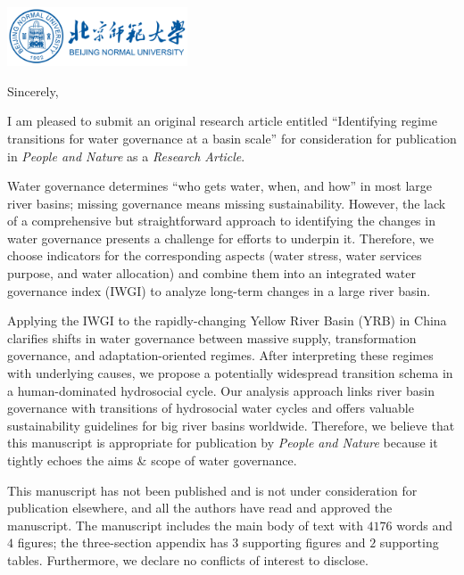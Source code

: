 \documentclass[11pt,a4paper,roman]{moderncv}
\begin{document}
\begin{minipage}[t]{\textwidth}
\includegraphics[width=0.40\textwidth]{bnu}
\end{minipage}


\opening{\vspace*{-2em}}
\closing{Sincerely,}{\vspace*{-2em}}
\makelettertitle

I am pleased to submit an original research article entitled ``Identifying regime transitions for water governance at a basin scale'' for consideration for publication in \textit{People and Nature} as a \textit{Research Article}.

Water governance determines ``who gets water, when, and how'' in most large river basins; missing governance means missing sustainability. However, the lack of a comprehensive but straightforward approach to identifying the changes in water governance presents a challenge for efforts to underpin it. Therefore, we choose indicators for the corresponding aspects (water stress, water services purpose, and water allocation) and combine them into an integrated water governance index (IWGI) to analyze long-term changes in a large river basin.

Applying the IWGI to the rapidly-changing Yellow River Basin (YRB) in China clarifies shifts in water governance between massive supply, transformation governance, and adaptation-oriented regimes. After interpreting these regimes with underlying causes, we propose a potentially widespread transition schema in a human-dominated hydrosocial cycle. Our analysis approach links river basin governance with transitions of hydrosocial water cycles and offers valuable sustainability guidelines for big river basins worldwide. Therefore, we believe that this manuscript is appropriate for publication by \textit{People and Nature} because it tightly echoes the aims \& scope of water governance.

This manuscript has not been published and is not under consideration for publication elsewhere, and all the authors have read and approved the manuscript. The manuscript includes the main body of text with $4176$ words and $4$ figures; the three-section appendix has $3$ supporting figures and $2$ supporting tables. Furthermore, we declare no conflicts of interest to disclose.
\end{document}
